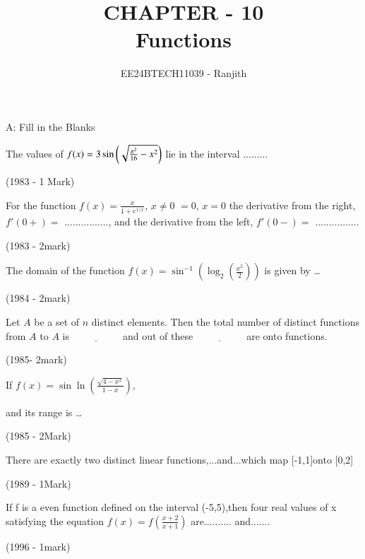 \documentclass[journal,12pt,twocolumn]{IEEEtran}
\theoremstyle{remark}
\begin{document}

\vspace{3cm}

\title{CHAPTER - 10\\Functions}
\author{EE24BTECH11039 - Ranjith}
\maketitle
\newpage
\bigskip

\renewcommand{\thefigure}{\theenumi}
\renewcommand{\thetable}{\theenumi}

\begin{flushleft}
\fontsize{18}{20}\selectfont
{A: Fill in the Blanks}
\end{flushleft}

\begin{enumerate}
\item The values of $f(x)=3\sin\left(\sqrt{\frac{\pi^2}{16}-x^2}\right) $ lie in the interval .........


\hfill{(1983 - 1 Mark)}

 

\item For the function \( f(x) = \frac{x}{1 + e^{1/x}} \), \( x \neq 0 \)
\( = 0 \), \( x = 0 \)
the derivative from the right, \( f'(0+) = \) ................, and the
derivative from the left, \( f'(0-) = \) ................ 



        
\hfill{(1983 - 2mark)}

\item{The domain of the function \( f(x) =\sin^{-1}\left(\log_{2}\left(\frac{x^{2}}{2}\right)\right) \) is given by \ldots \


\hfill 
{(1984 - 2mark)}

\item Let \( A \) be a set of \( n \) distinct elements. Then the total number of distinct functions from \( A \) to \( A \) is \( \underline{\hspace{2cm}} \) and out of these \( \underline{\hspace{2cm}} \) are onto functions.

\hfill
{(1985- 2mark)}


\item If $f(x) =\sin\ln  \left( \frac{\sqrt{4 - x^2}}{1 - x} \right), $

{and its range is } \ldots {} \quad \text


\hfill
{(1985 - 2Mark)}

 
\item There are exactly two distinct linear functions,...and...which map [-1,1]onto [0,2]

\hfill
{(1989 - 1Mark)}



 \item If f is a even function defined on the 
interval (-5,5),then four real values of x 
satisfying the equation $f(x)=f({\frac{x+2}{x+1}})$
are.......... and.......


\hfill{(1996 - 1mark)}
}
\end{enumerate}
\end{document}
